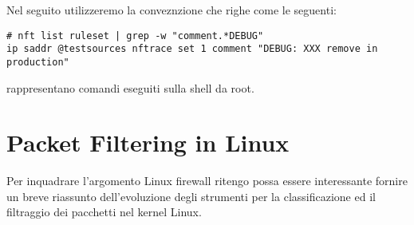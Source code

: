 Nel seguito utilizzeremo la conveznzione che righe come le seguenti:
\begin{lstlisting}
# nft list ruleset | grep -w "comment.*DEBUG"
ip saddr @testsources nftrace set 1 comment "DEBUG: XXX remove in production"
\end{lstlisting}
rappresentano comandi eseguiti sulla shell da root.

\chapter{Packet Filtering in Linux}

\label{Cenni storici} %

Per inquadrare l'argomento Linux firewall ritengo possa essere interessante
fornire un breve riassunto dell'evoluzione degli strumenti per la
classificazione ed il filtraggio dei pacchetti nel kernel Linux.


